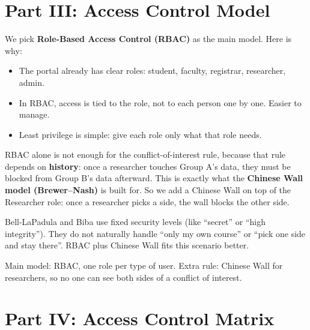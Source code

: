    \pagebreak

    \section{Part III: Access Control Model}

        We pick \textbf{Role-Based Access Control (RBAC)} as the main model. Here is why:

        \begin{itemize}
            \item The portal already has clear roles: student, faculty, registrar, researcher, admin.
            \item In RBAC, access is tied to the role, not to each person one by one. Easier to manage.
            \item Least privilege is simple: give each role only what that role needs.
        \end{itemize}

        \begin{notebox}
            RBAC alone is not enough for the conflict-of-interest rule, because that rule depends on
            \textbf{history}: once a researcher touches Group A's data, they must be blocked from Group B's
            data afterward. This is exactly what the \textbf{Chinese Wall model (Brewer--Nash)} is built for.
            So we add a Chinese Wall on top of the Researcher role: once a researcher picks a side, the wall
            blocks the other side.
        \end{notebox}

        \begin{notebox}
            Bell-LaPadula and Biba use fixed security levels (like ``secret'' or ``high integrity''). They do
            not naturally handle ``only my own course'' or ``pick one side and stay there''. RBAC plus Chinese
            Wall fits this scenario better.
        \end{notebox}

        \begin{takeawaybox}
            Main model: RBAC, one role per type of user. Extra rule: Chinese Wall for researchers, so no one
            can see both sides of a conflict of interest.
        \end{takeawaybox}

    \pagebreak

    \section{Part IV: Access Control Matrix}

